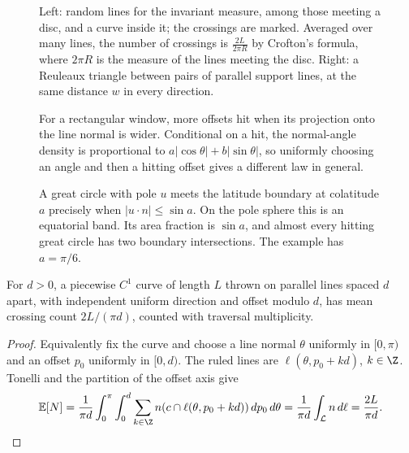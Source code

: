 \begin{figure}[ht]
\centering
{}
\caption{Left: random lines for the invariant measure, among those meeting a disc, and a curve inside it; the crossings are marked. Averaged over many lines, the number of crossings is
$\frac{2L}{2\pi R}$ by Crofton's formula, where $2\pi R$ is the measure of the lines meeting the disc. Right: a Reuleaux triangle between pairs of parallel support lines, at the same distance $w$ in every direction.}
\label{fig:crofton}
\end{figure}

\begin{figure}[ht]
\centering{}
\caption{For a rectangular window, more offsets hit when its projection onto the line normal is wider. Conditional on a hit, the normal-angle density is proportional to $a|\cos\theta|+b|\sin\theta|$, so uniformly choosing an angle and then a hitting offset gives a different law in general.}
\label{fig:v9-ch11-window-directions}
\end{figure}

\begin{figure}[ht]
\centering{}
\caption{A great circle with pole $u$ meets the latitude boundary at colatitude $a$ precisely when $|u\cdot n|\le\sin a$. On the pole sphere this is an equatorial band. Its area fraction is $\sin a$, and almost every hitting great circle has two boundary intersections. The example has $a=\pi/6$.}
\label{fig:v9-ch11-spherical-incidence}
\end{figure}

\begin{corollary}\label{cor:noodle}
For $d>0$, a piecewise $C^1$ curve of length $L$ thrown on parallel lines spaced $d$ apart, with independent uniform direction and offset modulo $d$, has mean crossing count $2L/(\pi d)$, counted with traversal multiplicity.
\end{corollary}

\begin{proof}
Equivalently fix the curve and choose a line normal $\theta$ uniformly in $[0,\pi)$ and an offset $p_0$ uniformly in $[0,d)$. The ruled lines are $\ell(\theta,p_0+kd)$, $k\in\Z$. Tonelli and the partition of the offset axis give
\[
\mathbb E[N]=\frac1{\pi d}\int_0^\pi\int_0^d
\sum_{k\in\Z}n(c\cap\ell(\theta,p_0+kd))\,dp_0\,d\theta
=\frac1{\pi d}\int_{\mathcal L}n\,d\ell
=\frac{2L}{\pi d}.
\]
\end{proof}


